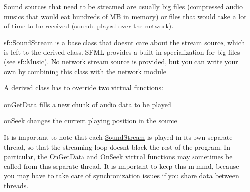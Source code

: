 \hyperlink{classsf_1_1Sound}{Sound} sources that need to be streamed are usually big files (compressed audio musics that would eat hundreds of MB in memory) or files that would take a lot of time to be received (sounds played over the network).

\hyperlink{classsf_1_1SoundStream}{sf\+::\+Sound\+Stream} is a base class that doesn\textquotesingle{}t care about the stream source, which is left to the derived class. S\+F\+ML provides a built-\/in specialization for big files (see \hyperlink{classsf_1_1Music}{sf\+::\+Music}). No network stream source is provided, but you can write your own by combining this class with the network module.

A derived class has to override two virtual functions\+: \begin{DoxyItemize}
\item on\+Get\+Data fills a new chunk of audio data to be played \item on\+Seek changes the current playing position in the source\end{DoxyItemize}
It is important to note that each \hyperlink{classsf_1_1SoundStream}{Sound\+Stream} is played in its own separate thread, so that the streaming loop doesn\textquotesingle{}t block the rest of the program. In particular, the On\+Get\+Data and On\+Seek virtual functions may sometimes be called from this separate thread. It is important to keep this in mind, because you may have to take care of synchronization issues if you share data between threads.

